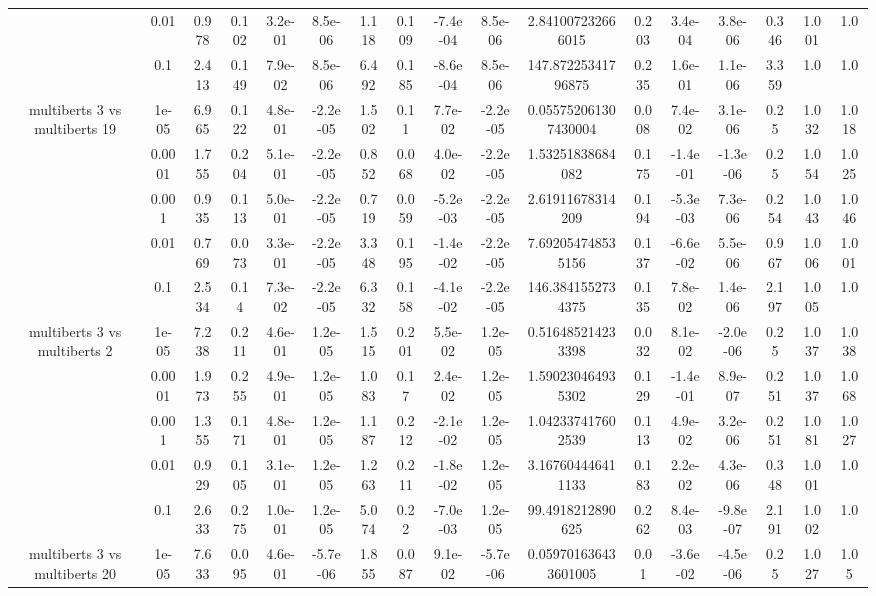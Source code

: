\begin{tabular}{|c|c|c|c|c|c|c|c|c|c|c|c|c|c|c|c|c|}
 & 0.01 & 0.978 & 0.102 & 3.2e-01 & 8.5e-06 & 1.118 & 0.109 & -7.4e-04 & 8.5e-06 & 2.841007232666015 & 0.203 & 3.4e-04 & 3.8e-06 & 0.346 & 1.001 & 1.0 \\
 & 0.1 & 2.413 & 0.149 & 7.9e-02 & 8.5e-06 & 6.492 & 0.185 & -8.6e-04 & 8.5e-06 & 147.87225341796875 & 0.235 & 1.6e-01 & 1.1e-06 & 3.359 & 1.0 & 1.0 \\
\hline
\multirow{5}{*}{multiberts 3 vs multiberts 19} & 1e-05 & 6.965 & 0.122 & 4.8e-01 & -2.2e-05 & 1.502 & 0.11 & 7.7e-02 & -2.2e-05 & 0.055752061307430004 & 0.008 & 7.4e-02 & 3.1e-06 & 0.25 & 1.032 & 1.018 \\
 & 0.0001 & 1.755 & 0.204 & 5.1e-01 & -2.2e-05 & 0.852 & 0.068 & 4.0e-02 & -2.2e-05 & 1.53251838684082 & 0.175 & -1.4e-01 & -1.3e-06 & 0.25 & 1.054 & 1.025 \\
 & 0.001 & 0.935 & 0.113 & 5.0e-01 & -2.2e-05 & 0.719 & 0.059 & -5.2e-03 & -2.2e-05 & 2.61911678314209 & 0.194 & -5.3e-03 & 7.3e-06 & 0.254 & 1.043 & 1.046 \\
 & 0.01 & 0.769 & 0.073 & 3.3e-01 & -2.2e-05 & 3.348 & 0.195 & -1.4e-02 & -2.2e-05 & 7.692054748535156 & 0.137 & -6.6e-02 & 5.5e-06 & 0.967 & 1.006 & 1.001 \\
 & 0.1 & 2.534 & 0.14 & 7.3e-02 & -2.2e-05 & 6.332 & 0.158 & -4.1e-02 & -2.2e-05 & 146.3841552734375 & 0.135 & 7.8e-02 & 1.4e-06 & 2.197 & 1.005 & 1.0 \\
\hline
\multirow{5}{*}{multiberts 3 vs multiberts 2} & 1e-05 & 7.238 & 0.211 & 4.6e-01 & 1.2e-05 & 1.515 & 0.201 & 5.5e-02 & 1.2e-05 & 0.516485214233398 & 0.032 & 8.1e-02 & -2.0e-06 & 0.25 & 1.037 & 1.038 \\
 & 0.0001 & 1.973 & 0.255 & 4.9e-01 & 1.2e-05 & 1.083 & 0.17 & 2.4e-02 & 1.2e-05 & 1.590230464935302 & 0.129 & -1.4e-01 & 8.9e-07 & 0.251 & 1.037 & 1.068 \\
 & 0.001 & 1.355 & 0.171 & 4.8e-01 & 1.2e-05 & 1.187 & 0.212 & -2.1e-02 & 1.2e-05 & 1.042337417602539 & 0.113 & 4.9e-02 & 3.2e-06 & 0.251 & 1.081 & 1.027 \\
 & 0.01 & 0.929 & 0.105 & 3.1e-01 & 1.2e-05 & 1.263 & 0.211 & -1.8e-02 & 1.2e-05 & 3.167604446411133 & 0.183 & 2.2e-02 & 4.3e-06 & 0.348 & 1.001 & 1.0 \\
 & 0.1 & 2.633 & 0.275 & 1.0e-01 & 1.2e-05 & 5.074 & 0.22 & -7.0e-03 & 1.2e-05 & 99.4918212890625 & 0.262 & 8.4e-03 & -9.8e-07 & 2.191 & 1.002 & 1.0 \\
\hline
\multirow{5}{*}{multiberts 3 vs multiberts 20} & 1e-05 & 7.633 & 0.095 & 4.6e-01 & -5.7e-06 & 1.855 & 0.087 & 9.1e-02 & -5.7e-06 & 0.059701636433601005 & 0.01 & -3.6e-02 & -4.5e-06 & 0.25 & 1.027 & 1.05 \\

\end{tabular}
